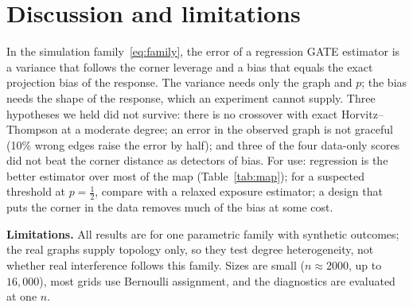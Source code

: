 \section{Discussion and limitations}\label{sec:discussion}
In the simulation family~\eqref{eq:family}, the error of a regression GATE estimator is a variance that follows the corner leverage and a bias that equals the exact projection bias of the response. The variance needs only the graph and $p$; the bias needs the shape of the response, which an experiment cannot supply.
Three hypotheses we held did not survive: there is no crossover with exact Horvitz--Thompson at a moderate degree; an error in the observed graph is not graceful (10\% wrong edges raise the error by half); and three of the four data-only scores did not beat the corner distance as detectors of bias.
For use: regression is the better estimator over most of the map (Table~\ref{tab:map}); for a suspected threshold at $p=\tfrac12$, compare with a relaxed exposure estimator; a design that puts the corner in the data removes much of the bias at some cost.

\textbf{Limitations.} All results are for one parametric family with synthetic outcomes; the real graphs supply topology only, so they test degree heterogeneity, not whether real interference follows this family. Sizes are small ($n\approx2000$, up to $16{,}000$), most grids use Bernoulli assignment, and the diagnostics are evaluated at one $n$.
